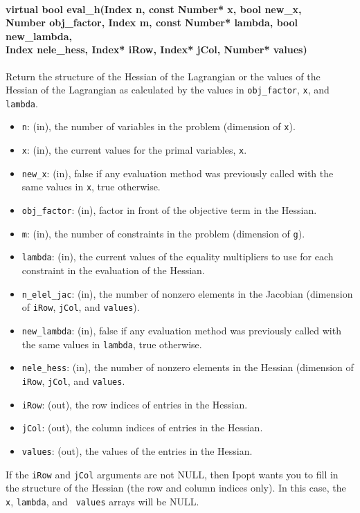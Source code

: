 \documentclass[letter,10pt]{article}
\begin{document}
{\paragraph{virtual bool eval\_h(Index n, const Number* x, bool new\_x,\\
   Number obj\_factor, Index m, const Number* lambda, bool new\_lambda,\\
        Index nele\_hess, Index* iRow, Index* jCol, Number* values)}
$\;$ \\
Return the structure of the Hessian of the Lagrangian or the values of the 
Hessian of the Lagrangian as calculated by the values in {\tt obj\_factor},
{\tt x}, and {\tt lambda}.
\begin{itemize}
\item {\tt n}: (in), the number of variables in the problem (dimension of {\tt x}). 
\item {\tt x}: (in), the current values for the primal variables, {\tt x}.
\item {\tt new\_x}: (in), false if any evaluation method was previously called 
        with the same values in {\tt x}, true otherwise.
\item {\tt obj\_factor}: (in), factor in front of the objective term in the Hessian.
\item {\tt m}: (in), the number of constraints in the problem (dimension of {\tt g}).
\item {\tt lambda}: (in), the current values of the equality multipliers to use
        for each constraint in the evaluation of the Hessian.
\item {\tt n\_elel\_jac}: (in), the number of nonzero elements in the 
        Jacobian (dimension of {\tt iRow}, {\tt jCol}, and {\tt values}).
\item {\tt new\_lambda}: (in), false if any evaluation method was previously called 
        with the same values in {\tt lambda}, true otherwise.
\item {\tt nele\_hess}: (in), the number of nonzero elements in the Hessian 
        (dimension of {\tt iRow}, {\tt jCol}, and {\tt values}.
\item {\tt iRow}: (out), the row indices of entries in the Hessian.
\item {\tt jCol}: (out), the column indices of entries in the Hessian.
\item {\tt values}: (out), the values of the entries in the Hessian.
\end{itemize}

If the {\tt iRow} and {\tt jCol} arguments are not NULL, then Ipopt
wants you to fill in the structure of the Hessian (the row and column
indices only). In this case, the {\tt x}, {\tt lambda}, and {\tt
values} arrays will be NULL.

}
\end{document}
